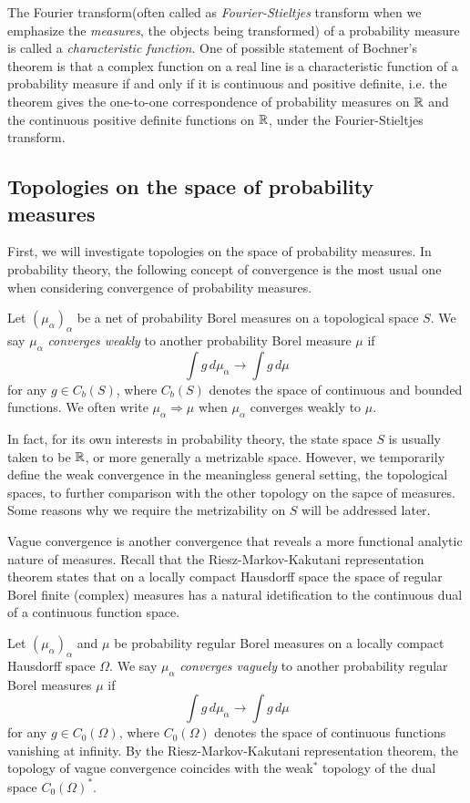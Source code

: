 \documentclass[10pt]{article}
\begin{document}
The Fourier transform(often called as \emph{Fourier-Stieltjes} transform when we emphasize the \emph{measures}, the objects being transformed) of a probability measure is called a \emph{characteristic function}.
One of possible statement of Bochner's theorem is that a complex function on a real line is a characteristic function of a probability measure if and only if it is continuous and positive definite, i.e. the theorem gives the one-to-one correspondence of probability measures on $\mathbb{R}$ and the continuous positive definite functions on $\mathbb{R}$, under the Fourier-Stieltjes transform.


\subsection{Topologies on the space of probability measures}

First, we will investigate topologies on the space of probability measures.
In probability theory, the following concept of convergence is the most usual one when considering convergence of probability measures.

\begin{defn}
Let $(\mu_\alpha)_\alpha$ be a net of probability Borel measures on a topological space $S$.
We say $\mu_\alpha$ \emph{converges weakly} to another probability Borel measure $\mu$ if
\[\int g\,d\mu_\alpha\to\int g\,d\mu\]
for any $g\in C_b(S)$, where $C_b(S)$ denotes the space of continuous and bounded functions.
We often write $\mu_\alpha\Rightarrow\mu$ when $\mu_\alpha$ converges weakly to $\mu$.
\end{defn}

In fact, for its own interests in probability theory, the state space $S$ is usually taken to be $\mathbb{R}$, or more generally a metrizable space.
However, we temporarily define the weak convergence in the meaningless general setting, the topological spaces, to further comparison with the other topology on the sapce of measures.
Some reasons why we require the metrizability on $S$ will be addressed later.

Vague convergence is another convergence that reveals a more functional analytic nature of measures.
Recall that the Riesz-Markov-Kakutani representation theorem states that on a locally compact Hausdorff space the space of regular Borel finite (complex) measures has a natural idetification to the continuous dual of a continuous function space.

\begin{defn}
Let $(\mu_\alpha)_\alpha$ and $\mu$ be probability regular Borel measures on a locally compact Hausdorff space $\Omega$.
We say $\mu_\alpha$ \emph{converges vaguely} to another probability regular Borel measures $\mu$ if
\[\int g\,d\mu_\alpha\to\int g\,d\mu\]
for any $g\in C_0(\Omega)$, where $C_0(\Omega)$ denotes the space of continuous functions vanishing at infinity.
By the Riesz-Markov-Kakutani representation theorem, the topology of vague convergence coincides with the weak$^*$ topology of the dual space $C_0(\Omega)^*$.
\end{defn}
\end{document}
